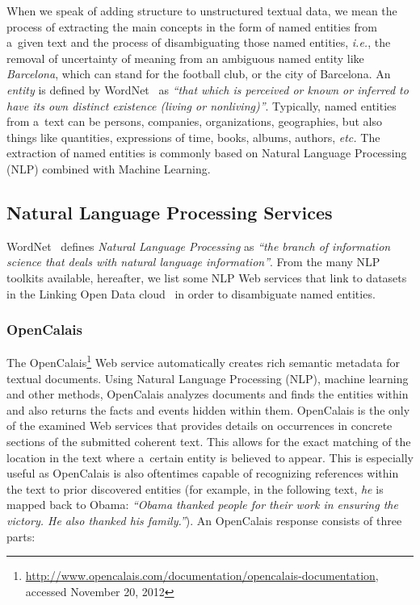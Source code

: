 When we speak of adding structure to unstructured textual data,
we mean the process of extracting the main concepts
in the form of named entities from a~given text
and the process of disambiguating those named entities,
\emph{i.e.}, the removal of uncertainty of meaning from
an ambiguous named entity like \emph{Barcelona},
which can stand for the football club, or the city of Barcelona.
An \emph{entity} is defined by
WordNet~\cite{miller1995wordnet,fellbaum1998wordnet}
as \textit{``that which is perceived or known or inferred
to have its own distinct existence (living or nonliving)''}. 
Typically, named entities from a~text can be persons, companies,
organizations, geographies, but also things like quantities,
expressions of time, books, albums, authors, \emph{etc.}
The extraction of named entities is commonly based on
Natural Language Processing (NLP) combined with Machine Learning.

\subsection{Natural Language Processing Services}
\label{sec:nlp-services}

WordNet~\cite{miller1995wordnet,fellbaum1998wordnet}
defines \emph{Natural Language Processing} as
\textit{``the branch of information science that deals with
natural language information''}.
From the many NLP toolkits available,
hereafter, we list some NLP Web services
that link to datasets in the
Linking Open Data
cloud~\cite{bizer2011statelodcloud,cyganiak2011lodcloud}
in order to disambiguate named entities.

\subsubsection{OpenCalais}\label{sec:opencalais}

The
OpenCalais\footnote{\url{http://www.opencalais.com/documentation/opencalais-documentation},
accessed November 20, 2012}
Web service automatically creates rich semantic metadata
for textual documents.
Using Natural Language Processing (NLP),
machine learning and other methods, OpenCalais analyzes documents
and finds the entities within and also returns the facts and
events hidden within them.
OpenCalais is the only of the examined Web services
that provides details on occurrences in concrete sections
of the submitted coherent text.
This allows for the exact matching of the location in the text
where a~certain entity is believed to appear.
This is especially useful as OpenCalais
is also oftentimes capable of recognizing references
within the text to prior discovered entities
(for example, in the following text,
\emph{he} is mapped back to Obama: \textit{``\emph{Obama}
thanked people for their work in ensuring the victory.
\emph{He} also thanked his family.''}).
An OpenCalais response consists of three parts:

